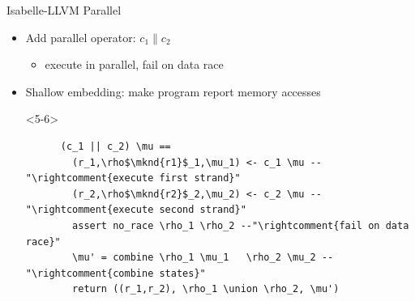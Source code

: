\documentclass[fleqn]{beamer}
\begin{document}
{\begin{frame}[t,fragile]{Isabelle-LLVM Parallel}
  \newcommand{\mknd}[1]{\makebox[0pt]{\tikz[remember picture]{\node (#1) {};}}}

  \begin{itemize}
   \item<2-> Add parallel operator: $c_1 \parallel c_2$
    \begin{itemize}
     \item<3-> execute in parallel, fail on data race
    \end{itemize}
   \item<4-> Shallow embedding: make program report memory accesses



    \begin{onlyenv}<5-6>
    \begin{lstlisting}
      (c_1 || c_2) \mu ==
        (r_1,\rho$\mknd{r1}$_1,\mu_1) <- c_1 \mu --"\rightcomment{execute first strand}"
        (r_2,\rho$\mknd{r2}$_2,\mu_2) <- c_2 \mu --"\rightcomment{execute second strand}"
        assert no_race \rho_1 \rho_2 --"\rightcomment{fail on data race}"
        \mu' = combine \rho_1 \mu_1   \rho_2 \mu_2 --"\rightcomment{combine states}"
        return ((r_1,r_2), \rho_1 \union \rho_2, \mu')

    \end{lstlisting}

    \end{onlyenv}

  \end{itemize}
\end{frame}
}
\end{document}
